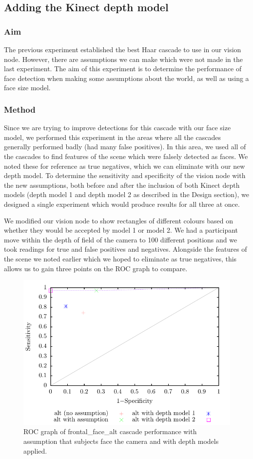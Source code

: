 \documentclass[conference]{IEEEtran}
\begin{document}
\subsection{Adding the Kinect depth model}
\subsubsection{Aim}
The previous experiment established the best Haar cascade to use in our vision node. However, there are assumptions we can make which were not made in the last experiment. The aim of this experiment is to determine the performance of face detection when making some assumptions about the world, as well as using a face size model.
\subsubsection{Method}
Since we are trying to improve detections for this cascade with our face size model, we performed this experiment in the areas where all the cascades generally performed badly (had many false positives). In this area, we used all of the cascades to find features of the scene which were falsely detected as faces. We noted these for reference as true negatives, which we can eliminate with our new depth model. To determine the sensitivity and specificity of the vision node with the new assumptions, both before and after the inclusion of both Kinect depth models (depth model 1 and depth model 2 as described in the Design section), we designed a single experiment which would produce results for all three at once.

We modified our vision node to show rectangles of different colours based on whether they would be accepted by model 1 or model 2. We had a participant move within the depth of field of the camera to 100 different positions and we took readings for true and false positives and negatives. Alongside the features of the scene we noted earlier which we hoped to eliminate as true negatives, this allows us to gain three points on the ROC graph to compare.
\begin{figure}[h]
  \includegraphics[width=\columnwidth]{kinect_ROC}
  \caption{ROC graph of frontal\_face\_alt cascade performance with assumption that subjects face the camera and with depth models applied.}
  \label{fig:cascade_with_model}
\end{figure}
\end{document}
